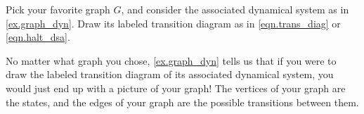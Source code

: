 \documentclass[Book-Poly]{subfiles}
\begin{document}

\begin{exercise}
Pick your favorite graph $G$, and consider the associated dynamical system as in \cref{ex.graph_dyn}.
Draw its labeled transition diagram as in \eqref{eqn.trans_diag} or \eqref{eqn.halt_dsa}.
\begin{solution}
No matter what graph you chose, \cref{ex.graph_dyn} tells us that if you were to draw the labeled transition diagram of its associated dynamical system, you would just end up with a picture of your graph!
The vertices of your graph are the states, and the edges of your graph are the possible transitions between them.
\end{solution}
\end{exercise}



\end{document}
